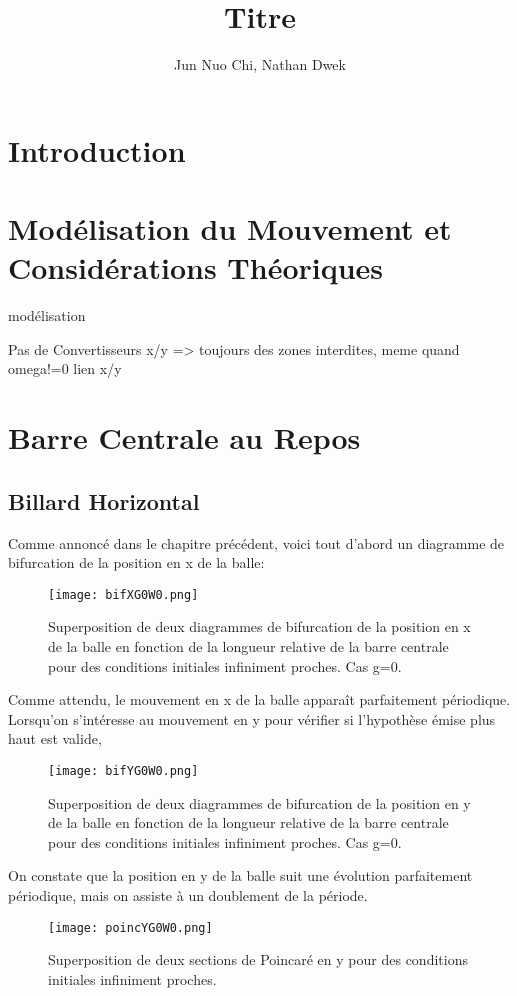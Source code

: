 \documentclass[a4paper]{report}
\title{Titre}
\author{Jun Nuo Chi, Nathan Dwek}
\begin{document}
\maketitle
\tableofcontents
\begin{abstract}

\end{abstract}

\chapter{Introduction}


\chapter{Modélisation du Mouvement et Considérations Théoriques}
modélisation



Pas de Convertisseurs x/y => toujours des zones interdites, meme quand omega!=0
lien x/y


\chapter{Barre Centrale au Repos}

\section{Billard Horizontal}
Comme annoncé dans le chapitre précédent, voici tout d'abord un diagramme de bifurcation de la position en x de la balle:
\begin{figure}[h!]
   \texttt{[image: bifXG0W0.png]}
      \caption[Diagramme de bifurcation en x: g=0 ]{Superposition de deux diagrammes de bifurcation de la position en x de la balle en fonction de la longueur relative de la barre centrale pour des conditions initiales infiniment proches. Cas g=0.}
\end{figure}

Comme attendu, le mouvement en x de la balle apparaît parfaitement périodique. Lorsqu'on s'intéresse au mouvement en y pour vérifier si l'hypothèse émise plus haut est valide,
\begin{figure}[h!]
   \texttt{[image: bifYG0W0.png]}
      \caption[Diagramme de bifurcation en y: g=0 ]{Superposition de deux diagrammes de bifurcation de la position en y de la balle en fonction de la longueur relative de la barre centrale pour des conditions initiales infiniment proches. Cas g=0.}
\end{figure}
On constate que la position en y de la balle suit une évolution parfaitement périodique, mais on assiste à un doublement de la période.
\begin{figure}[H]
   \texttt{[image: poincYG0W0.png]}
      \caption[Section de Poincaré en y: g=0 ]{Superposition de deux sections de Poincaré en y pour des conditions initiales infiniment proches.}
\end{figure}
\end{document}
